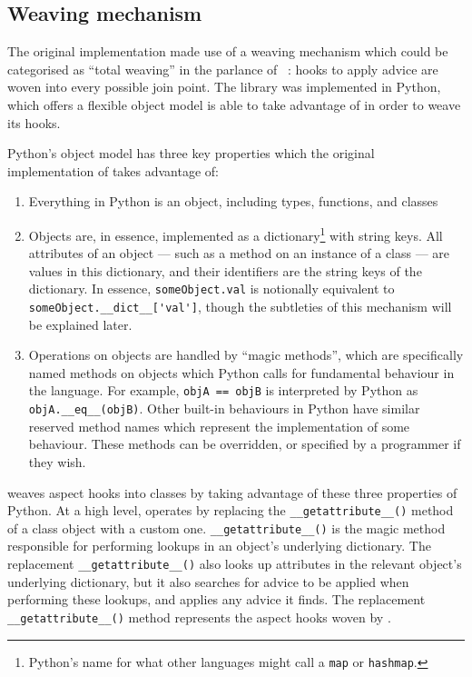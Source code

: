 \subsection{Weaving mechanism}\label{subsec:prior_work_weaving}
The original \pdsf implementation made use of a weaving mechanism which could be
categorised as ``total weaving'' in the parlance of
\citeauthor{dynamicAOchitchyan}~\cite{dynamicAOchitchyan}: hooks to apply advice
are woven into every possible join point. The library was implemented in Python,
which offers a flexible object model \pdsf is able to take advantage of in order
to weave its hooks.

Python's object model has three key properties which the original implementation
of \pdsf takes advantage of:

\begin{enumerate}
    \item Everything in Python is an object, including types, functions, and
    classes
    \item Objects are, in essence, implemented as a dictionary\footnote{Python's
    name for what other languages might call a \lstinline{map} or
    \lstinline{hashmap}.} with string keys. All attributes of an object --- such
    as a method on an instance of a class --- are values in this dictionary, and
    their identifiers are the string keys of the dictionary. In essence,
    \lstinline{someObject.val} is notionally equivalent to
    \lstinline{someObject.__dict__['val']}, though the subtleties of this
    mechanism will be explained later.
    \item Operations on objects are handled by ``magic methods'', which are
    specifically named methods on objects which Python calls for fundamental
    behaviour in the language. For example, \lstinline{objA == objB} is
    interpreted by Python as \lstinline{objA.__eq__(objB)}. Other built-in
    behaviours in Python have similar reserved method names which represent the
    implementation of some behaviour. These methods can be overridden, or
    specified by a programmer if they wish.
\end{enumerate}

\pdsf weaves aspect hooks into classes by taking advantage of these three
properties of Python. At a high level, \pdsf operates by replacing the
\lstinline{__getattribute__()} method of a class object with a custom one.
\lstinline{__getattribute__()} is the magic method responsible for performing
lookups in an object's underlying dictionary. The replacement
\lstinline{__getattribute__()} also looks up attributes in the relevant object's
underlying dictionary, but it also searches for advice to be applied when
performing these lookups, and applies any advice it finds. The replacement
\lstinline{__getattribute__()} method represents the aspect hooks woven by
\pdsf{}.

